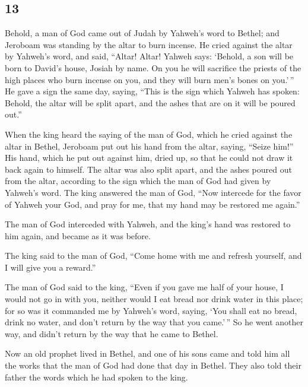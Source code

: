 \begin{paracol}{2}
\switchcolumn
\begin{otherlanguage}{english}

\hypertarget{section-25}{%
\section{13}\label{section-25}}

 Behold, a man of God came out of Judah by Yahweh's word
to Bethel; and Jeroboam was standing by the altar to burn incense.
 He cried against the altar by Yahweh's word, and said,
``Altar! Altar! Yahweh says: `Behold, a son will be born to David's
house, Josiah by name. On you he will sacrifice the priests of the high
places who burn incense on you, and they will burn men's bones on
you.'\,''  He gave a sign the same day, saying, ``This is
the sign which Yahweh has spoken: Behold, the altar will be split apart,
and the ashes that are on it will be poured out.''

 When the king heard the saying of the man of God, which
he cried against the altar in Bethel, Jeroboam put out his hand from the
altar, saying, ``Seize him!'' His hand, which he put out against him,
dried up, so that he could not draw it back again to himself.
 The altar was also split apart, and the ashes poured out
from the altar, according to the sign which the man of God had given by
Yahweh's word.  The king answered the man of God, ``Now
intercede for the favor of Yahweh your God, and pray for me, that my
hand may be restored me again.''

The man of God interceded with Yahweh, and the king's hand was restored
to him again, and became as it was before.

 The king said to the man of God, ``Come home with me and
refresh yourself, and I will give you a reward.''

 The man of God said to the king, ``Even if you gave me
half of your house, I would not go in with you, neither would I eat
bread nor drink water in this place;  for so was it
commanded me by Yahweh's word, saying, `You shall eat no bread, drink no
water, and don't return by the way that you came.'\,'' 
So he went another way, and didn't return by the way that he came to
Bethel.

 Now an old prophet lived in Bethel, and one of his sons
came and told him all the works that the man of God had done that day in
Bethel. They also told their father the words which he had spoken to the
king.


\end{otherlanguage}
\end{paracol}
